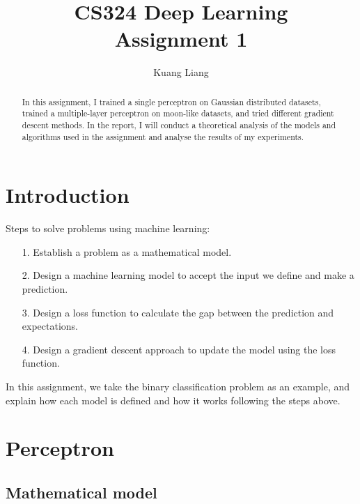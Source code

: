 \documentclass[12pt]{article}
\begin{document}
 
 
\title{CS324 Deep Learning\\ \textbf{Assignment 1}}
\author{Kuang Liang}

\maketitle

\begin{abstract}
In this assignment, I trained a single perceptron on Gaussian distributed datasets, trained a multiple-layer perceptron on moon-like datasets, and tried different gradient descent methods. In the report, I will conduct a theoretical analysis of the models and algorithms used in the assignment and analyse the results of my experiments.
\end{abstract}



\section{Introduction}

Steps to solve problems using machine learning:

\begin{itemize}
    \item [1.] Establish a problem as a mathematical model.
    \item [2.] Design a machine learning model to accept the input we define and make a prediction.
    \item [3.] Design a loss function to calculate the gap between the prediction and expectations.
    \item [4.] Design a gradient descent approach to update the model using the loss function.
\end{itemize}

In this assignment, we take the binary classification problem as an example, and explain how each model is defined and how it works following the steps above.

\section{Perceptron}

\subsection{Mathematical model}
    
\end{document}
